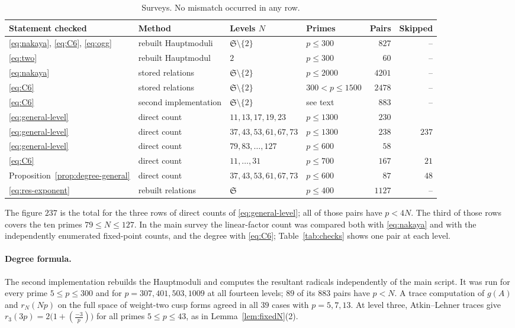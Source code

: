 \documentclass[11pt,a4paper]{article}
\theoremstyle{remark}\newtheorem{remark}[theorem]{Remark}
\numberwithin{equation}{section}
\newcommand{\leg}[2]{\left(\frac{#1}{#2}\right)}
\begin{document}
\begin{table}[ht]
	\centering\footnotesize\setlength{\tabcolsep}{4.5pt}
	\caption{Surveys. No mismatch occurred in any row.}
	\label{tab:surveys}
	\begin{tabular}{llllrr}\toprule
		Statement checked & Method & Levels $N$ & Primes & Pairs & Skipped\\\midrule
		\eqref{eq:nakaya}, \eqref{eq:C6}, \eqref{eq:ogg} & rebuilt Hauptmoduli & $\mathfrak S\setminus\{2\}$ & $p\leq300$ & $827$ & --\\
		\eqref{eq:two} & rebuilt Hauptmodul & $2$ & $p\leq300$ & $60$ & --\\
		\eqref{eq:nakaya} & stored relations & $\mathfrak S\setminus\{2\}$ & $p\leq2000$ & $4201$ & --\\
		\eqref{eq:C6} & stored relations & $\mathfrak S\setminus\{2\}$ & $300<p\leq1500$ & $2478$ & --\\
		\eqref{eq:C6} & second implementation & $\mathfrak S\setminus\{2\}$ & see text & $883$ & --\\
		\eqref{eq:general-level} & direct count & $11,13,17,19,23$ & $p\leq1300$ & $230$ & \\
		\eqref{eq:general-level} & direct count & $37,43,53,61,67,73$ & $p\leq1300$ & $238$ & $237$\\
		\eqref{eq:general-level} & direct count & $79,83,\dots,127$ & $p\leq600$ & $58$ & \\
		\eqref{eq:C6} & direct count & $11,\dots,31$ & $p\leq700$ & $167$ & $21$\\
		Proposition~\ref{prop:degree-general} & direct count & $37,43,53,61,67,73$ & $p\leq600$ & $87$ & $48$\\
		\eqref{eq:res-exponent} & rebuilt relations & $\mathfrak S$ & $p\leq400$ & $1127$ & --\\\bottomrule
	\end{tabular}
\end{table}

The figure $237$ is the total for the three rows of direct counts of \eqref{eq:general-level}; all of those pairs have $p<4N$. The third of those rows covers the ten primes $79\leq N\leq127$. In the main survey the linear-factor count was compared both with \eqref{eq:nakaya} and with the independently enumerated fixed-point counts, and the degree with \eqref{eq:C6}; Table~\ref{tab:checks} shows one pair at each level.

\paragraph{Degree formula.} The second implementation rebuilds the Hauptmoduli and computes the resultant radicals independently of the main script. It was run for every prime $5\leq p\leq300$ and for $p=307,401,503,1009$ at all fourteen levels; $89$ of its $883$ pairs have $p<N$. A trace computation of $g(A)$ and $r_N(Np)$ on the full space of weight-two cusp forms agreed in all $39$ cases with $p=5,7,13$. At level three, Atkin--Lehner traces give $r_3(3p)=2\bigl(1+\leg{-3}{p}\bigr)$ for all primes $5\leq p\leq43$, as in Lemma~\ref{lem:fixedN}(2).
\end{document}
